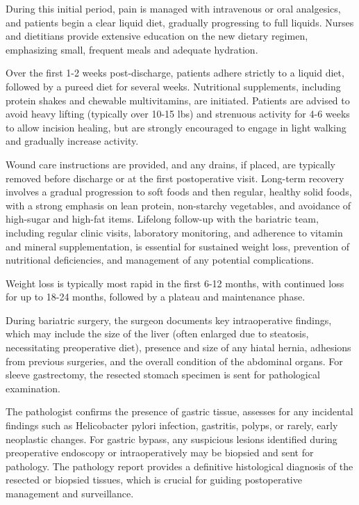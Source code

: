 During this initial period, pain is managed with intravenous or oral analgesics, and patients begin a clear liquid diet, gradually progressing to full liquids. Nurses and dietitians provide extensive education on the new dietary regimen, emphasizing small, frequent meals and adequate hydration. 

Over the first 1-2 weeks post-discharge, patients adhere strictly to a liquid diet, followed by a pureed diet for several weeks. Nutritional supplements, including protein shakes and chewable multivitamins, are initiated. Patients are advised to avoid heavy lifting (typically over 10-15 lbs) and strenuous activity for 4-6 weeks to allow incision healing, but are strongly encouraged to engage in light walking and gradually increase activity. 

Wound care instructions are provided, and any drains, if placed, are typically removed before discharge or at the first postoperative visit. Long-term recovery involves a gradual progression to soft foods and then regular, healthy solid foods, with a strong emphasis on lean protein, non-starchy vegetables, and avoidance of high-sugar and high-fat items. Lifelong follow-up with the bariatric team, including regular clinic visits, laboratory monitoring, and adherence to vitamin and mineral supplementation, is essential for sustained weight loss, prevention of nutritional deficiencies, and management of any potential complications. 

Weight loss is typically most rapid in the first 6-12 months, with continued loss for up to 18-24 months, followed by a plateau and maintenance phase.

During bariatric surgery, the surgeon documents key intraoperative findings, which may include the size of the liver (often enlarged due to steatosis, necessitating preoperative diet), presence and size of any hiatal hernia, adhesions from previous surgeries, and the overall condition of the abdominal organs. For sleeve gastrectomy, the resected stomach specimen is sent for pathological examination. 

The pathologist confirms the presence of gastric tissue, assesses for any incidental findings such as Helicobacter pylori infection, gastritis, polyps, or rarely, early neoplastic changes. For gastric bypass, any suspicious lesions identified during preoperative endoscopy or intraoperatively may be biopsied and sent for pathology. The pathology report provides a definitive histological diagnosis of the resected or biopsied tissues, which is crucial for guiding postoperative management and surveillance. 

